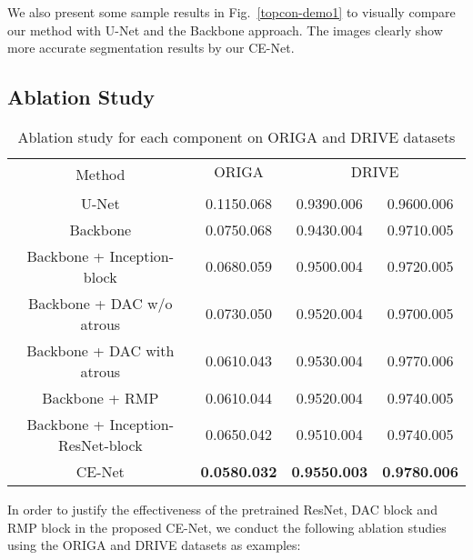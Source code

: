 \documentclass[journal]{IEEEtran}
\begin{document}
We also present some sample results in Fig.~\ref{topcon-demo1} to visually compare our method with U-Net and the Backbone approach. The images clearly show more accurate segmentation results by our CE-Net. 

\subsection{Ablation Study }
 
 \begin{table*}[h] 
	\normalsize
	\caption{Ablation study for each component on ORIGA and DRIVE datasets} 
	\centering
\begin{tabular}{c|c|c|c}
\hline
\multirow{2}{*}{Method} & \multirow{1}{*}{ORIGA} & \multicolumn{2}{c}{DRIVE}                 \\ \cline{2-4} 
 & \multicolumn{1}{c|}{} & \multicolumn{1}{c|}{} & \multicolumn{1}{c}{} \\ \hline
	U-Net  & 0.1150.068 & 0.9390.006& 0.9600.006 \\ \hline
	Backbone  & 0.0750.068 & 0.9430.004& 0.9710.005\\ \hline
	Backbone + Inception-block & 0.0680.059& 0.9500.004& 0.9720.005 \\ \hline
    Backbone + DAC w/o atrous & 0.0730.050 & 0.9520.004& 0.9700.005 \\ \hline
	Backbone + DAC with atrous & 0.0610.043 & 0.9530.004& 0.9770.006 \\ \hline
	Backbone + RMP & 0.0610.044 & 0.9520.004& 0.9740.005 \\ \hline
	Backbone + Inception-ResNet-block & 0.0650.042 & 0.9510.004& 0.9740.005\\ \hline

	CE-Net & \textbf{0.0580.032} & \textbf{0.9550.003} & \textbf{0.9780.006} \\ \hline
	\end{tabular}
	\label{ablation_study}
\end{table*}
 


In order to justify the effectiveness of the pretrained ResNet, DAC block and RMP block in the proposed CE-Net, we conduct the following ablation studies using the ORIGA and DRIVE datasets as examples: 
\end{document}
